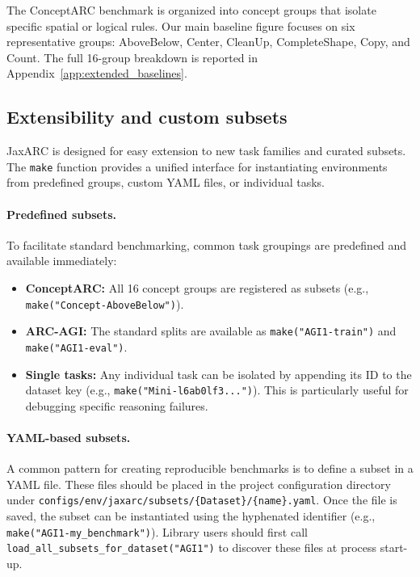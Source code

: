 The ConceptARC benchmark is organized into concept groups that isolate specific spatial or logical rules. Our main baseline figure focuses on six representative groups: AboveBelow, Center, CleanUp, CompleteShape, Copy, and Count. The full 16-group breakdown is reported in Appendix~\ref{app:extended_baselines}.

\subsection{Extensibility and custom subsets}
\label{app:extensibility}

JaxARC is designed for easy extension to new task families and curated subsets. The \texttt{make} function provides a unified interface for instantiating environments from predefined groups, custom YAML files, or individual tasks.

\paragraph{Predefined subsets.}
To facilitate standard benchmarking, common task groupings are predefined and available immediately:
\begin{itemize}
    \item \textbf{ConceptARC:} All 16 concept groups are registered as subsets (e.g., \texttt{make("Concept-AboveBelow")}).
    \item \textbf{ARC-AGI:} The standard splits are available as \texttt{make("AGI1-train")} and \texttt{make("AGI1-eval")}.
    \item \textbf{Single tasks:} Any individual task can be isolated by appending its ID to the dataset key (e.g., \texttt{make("Mini-l6ab0lf3...")}). This is particularly useful for debugging specific reasoning failures.
\end{itemize}

\paragraph{YAML-based subsets.}
A common pattern for creating reproducible benchmarks is to define a subset in a YAML file. These files should be placed in the project configuration directory under \texttt{configs/env/jaxarc/subsets/\{Dataset\}/\{name\}.yaml}. Once the file is saved, the subset can be instantiated using the hyphenated identifier (e.g., \texttt{make("AGI1-my\_benchmark")}). Library users should first call \texttt{load\_all\_subsets\_for\_dataset("AGI1")} to discover these files at process start-up.

